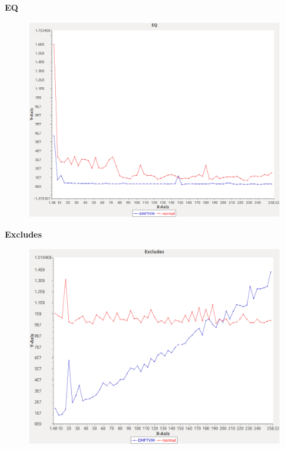 \noindent\textbf{EQ}

\begin{figure}[h]
\centering
\includegraphics[width=\textwidth]{../graphs/set/EQ}
\end{figure}
\pagebreak

\noindent\textbf{Excludes}

\begin{figure}[h]
\centering
\includegraphics[width=\textwidth]{../graphs/set/Excludes}
\end{figure}
\pagebreak

